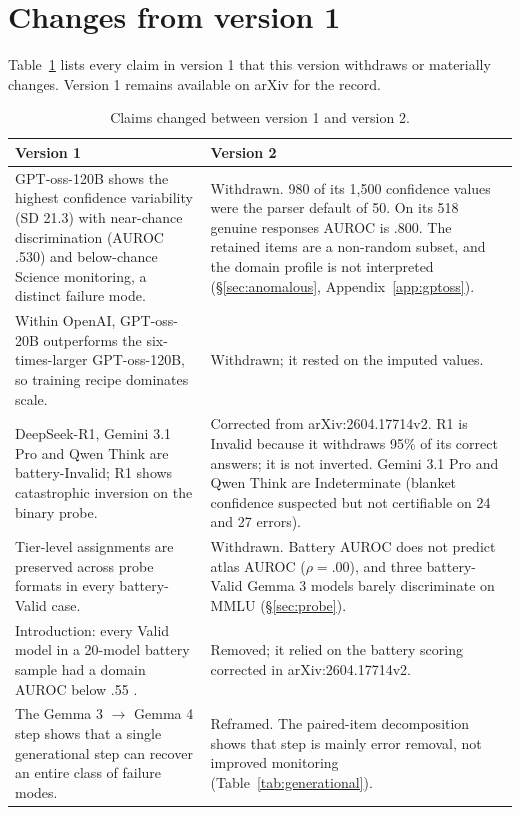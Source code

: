 \section{Changes from version 1}
\label{app:changes}

Table~\ref{tab:changes} lists every claim in version 1 that this version withdraws or materially changes. Version 1 remains available on arXiv for the record.

\begin{table}[!htbp]
\centering
\caption{Claims changed between version 1 and version 2.}
\label{tab:changes}
\small
\begin{tabular}{p{}p{}}
\toprule
\textbf{Version 1} & \textbf{Version 2} \\
\midrule
GPT-oss-120B shows the highest confidence variability (SD 21.3) with near-chance discrimination (AUROC .530) and below-chance Science monitoring, a distinct failure mode. & Withdrawn. 980 of its 1{,}500 confidence values were the parser default of 50. On its 518 genuine responses AUROC is .800. The retained items are a non-random subset, and the domain profile is not interpreted (\S\ref{sec:anomalous}, Appendix~\ref{app:gptoss}). \\
\addlinespace
Within OpenAI, GPT-oss-20B outperforms the six-times-larger GPT-oss-120B, so training recipe dominates scale. & Withdrawn; it rested on the imputed values. \\
\addlinespace
DeepSeek-R1, Gemini 3.1 Pro and Qwen Think are battery-Invalid; R1 shows catastrophic inversion on the binary probe. & Corrected from arXiv:2604.17714v2. R1 is Invalid because it withdraws 95\% of its correct answers; it is not inverted. Gemini 3.1 Pro and Qwen Think are Indeterminate (blanket confidence suspected but not certifiable on 24 and 27 errors). \\
\addlinespace
Tier-level assignments are preserved across probe formats in every battery-Valid case. & Withdrawn. Battery AUROC does not predict atlas AUROC ($\rho = .00$), and three battery-Valid Gemma 3 models barely discriminate on MMLU (\S\ref{sec:probe}). \\
\addlinespace
Introduction: every Valid model in a 20-model battery sample had a domain AUROC below .55 \citep{cacioli2026c}. & Removed; it relied on the battery scoring corrected in arXiv:2604.17714v2. \\
\addlinespace
The Gemma 3 $\to$ Gemma 4 step shows that a single generational step can recover an entire class of failure modes. & Reframed. The paired-item decomposition shows that step is mainly error removal, not improved monitoring (Table~\ref{tab:generational}). \\

\end{tabular}
\end{table}
